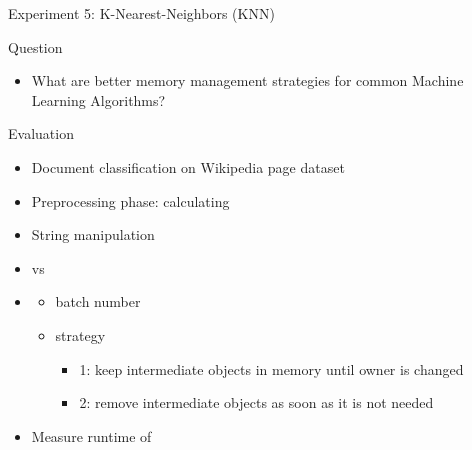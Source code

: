 \documentclass[9pt]{beamer}
\begin{document}

\begin{frame}[fragile]{Experiment 5: K-Nearest-Neighbors (KNN)}

    Question
    \begin{itemize}
        \item What are better memory management strategies for common Machine Learning Algorithms?
    \end{itemize}

    Evaluation
    \begin{itemize}
        \item Document classification on Wikipedia page dataset
        \item Preprocessing phase: calculating 
        \item String manipulation
        \item {} vs 
        \item {}
        \begin{itemize}
            \item batch number
            \item strategy
            \begin{itemize}
                \item 1: keep intermediate objects in memory until owner is changed
                \item 2: remove intermediate objects as soon as it is not needed
            \end{itemize}
        \end{itemize}
        \item Measure runtime of 
    \end{itemize}
\end{frame}

\end{document}
